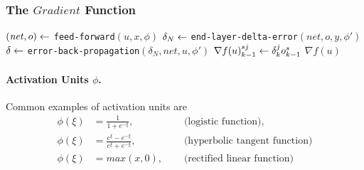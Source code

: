 \subsubsection{The $\mathit{Gradient}$ Function}
\begin{algorithm} \label{alg:mlp-gradient}
\begin{algorithmic}[1]
    \State $(\mathit{net}, o) \leftarrow$ \texttt{feed-forward}$(u, x, \phi)$
    \State $\delta_N \leftarrow$ \texttt{end-layer-delta-error}$(\mathit{net}, o, y, \phi')$
    \State $\delta \leftarrow$ \texttt{error-back-propagation}$(\delta_N, \mathit{net}, u, \phi')$
                \State $\nabla f(u)_{k-1}^{sj} \leftarrow \delta_k^j o_{k-1}^s$
            \EndFor
        \EndFor
    \EndFor
    \State \Return $\nabla f(u)$
\end{algorithmic}
\end{algorithm}

\paragraph{Activation Units $\phi$.}
Common examples of activation units are
\[\begin{alignedat}{3}
\phi(\xi) &= \frac{1}{1 + e^{-\xi}}, &\quad \text{ (logistic function),}\\
\phi(\xi) &= \frac{e^{\xi} - e^{-\xi}}{e^{\xi} + e^{-\xi}}, &\quad \text{ (hyperbolic tangent function)}\\
\phi(\xi) &= max(x,0), &\quad \text{ (rectified linear function)}\\
\end{alignedat}\]


